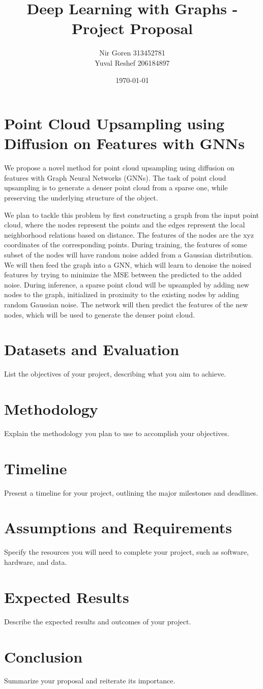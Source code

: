 \documentclass{article}
\title{Deep Learning with Graphs - Project Proposal}
\author{Nir Goren 313452781 \\ Yuval Reshef 206184897}
\date{\today}
\begin{document}
\maketitle

\section{Point Cloud Upsampling using Diffusion on Features with GNNs}
We propose a novel method for point cloud upsampling using diffusion on features with Graph Neural Networks (GNNs).
The task of point cloud upsampling is to generate a denser point cloud from a sparse one, while preserving the underlying structure of the object.

We plan to tackle this problem by first constructing a graph from the input point cloud, where the nodes represent the points and the edges represent the local neighborhood relations based on distance.
The features of the nodes are the xyz coordinates of the corresponding points. During training, the features of some subset of the nodes will have random noise added from a Gaussian distribution.
We will then feed the graph into a GNN, which will learn to denoise the noised features by trying to minimize the MSE between the predicted to the added noise. During inference, a sparse point cloud will be upsampled by adding new nodes to the graph, initialized in proximity to the existing nodes by adding random Gaussian noise. The network will then predict the features of the new nodes, which will be used to generate the denser point cloud.
\section{Datasets and Evaluation}
List the objectives of your project, describing what you aim to achieve.

\section{Methodology}
Explain the methodology you plan to use to accomplish your objectives.

\section{Timeline}
Present a timeline for your project, outlining the major milestones and deadlines.

\section{Assumptions and Requirements}
Specify the resources you will need to complete your project, such as software, hardware, and data.

\section{Expected Results}
Describe the expected results and outcomes of your project.

\section{Conclusion}
Summarize your proposal and reiterate its importance.

\printbibliography
\end{document}
